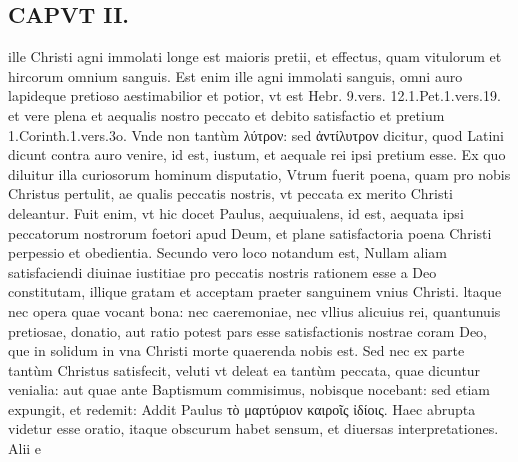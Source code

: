\documentclass{article}
\begin{document}
\begin{pages}
\section*{CAPVT II. }
\marginpar{[ p.61 ]}\pstart ille Christi agni immolati longe est maioris pretii, et effectus, quam vitulorum et hircorum omnium sanguis. Est enim ille agni immolati sanguis, omni auro lapideque pretioso aestimabilior et potior, vt est Hebr. 9.vers. 12.1.Pet.1.vers.19. et vere plena et aequalis nostro peccato et debito satisfactio et pretium 1.Corinth.1.vers.3o. Vnde non tantùm λύτρον: sed ἀντίλυτρον dicitur, quod Latini dicunt contra auro venire, id est, iustum, et aequale rei ipsi pretium esse. Ex quo diluitur illa curiosorum hominum disputatio, Vtrum fuerit poena, quam pro nobis Christus pertulit, ae qualis peccatis nostris, vt peccata ex merito Christi deleantur. Fuit enim, vt hic docet Paulus, aequiualens, id est, aequata ipsi peccatorum nostrorum foetori apud Deum, et plane satisfactoria poena Christi perpessio et obedientia.  \pend\pstart Secundo vero loco notandum est, Nullam aliam satisfaciendi diuinae iustitiae pro peccatis nostris rationem esse a Deo constitutam, illique gratam et acceptam praeter sanguinem vnius Christi. ltaque nec opera quae vocant bona: nec caeremoniae, nec vllius alicuius rei, quantunuis pretiosae, donatio, aut ratio potest pars esse satisfactionis nostrae coram Deo, que in solidum in vna Christi morte quaerenda nobis est. Sed nec ex parte tantùm Christus satisfecit, veluti vt deleat ea tantùm peccata, quae dicuntur venialia: aut quae ante Baptismum commisimus, nobisque nocebant: sed etiam expungit, et redemit:  \pend\pstart Addit Paulus τὸ μαρτύριον καιροῖς ἰδίοις. Haec abrupta videtur esse oratio, itaque obscurum habet sensum, et diuersas interpretationes. Alii e\pend

\end{pages}
\end{document}
